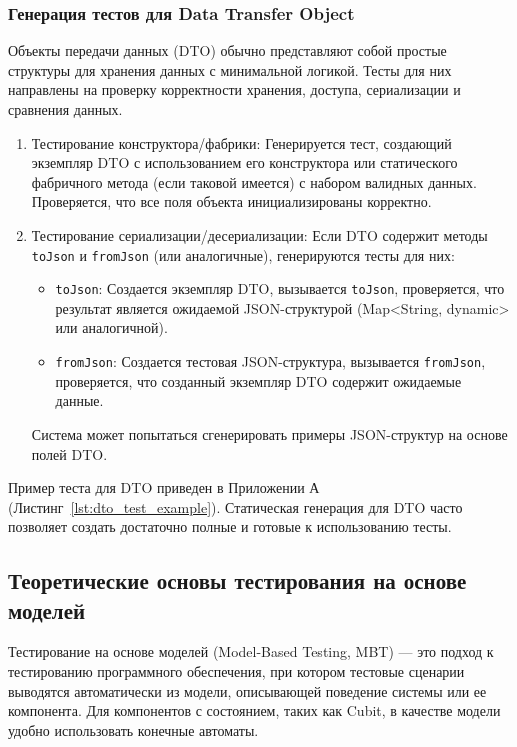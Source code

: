 \documentclass[14pt, russian]{scrartcl}
\begin{document}
\subsubsection{Генерация тестов для Data Transfer Object}

Объекты передачи данных (DTO) обычно представляют собой простые структуры для хранения данных с минимальной логикой. Тесты для них направлены на проверку корректности хранения, доступа, сериализации и сравнения данных.

\begin{enumerate}
    \item {Тестирование конструктора/фабрики:} Генерируется тест, создающий экземпляр DTO с использованием его конструктора или статического фабричного метода (если таковой имеется) с набором валидных данных. Проверяется, что все поля объекта инициализированы корректно.
    \item {Тестирование сериализации/десериализации:} Если DTO содержит методы \texttt{toJson} и \texttt{fromJson} (или аналогичные), генерируются тесты для них:
        \begin{itemize}
            \item \texttt{toJson}: Создается экземпляр DTO, вызывается \texttt{toJson}, проверяется, что результат является ожидаемой JSON-структурой (Map<String, dynamic> или аналогичной).
            \item \texttt{fromJson}: Создается тестовая JSON-структура, вызывается \texttt{fromJson}, проверяется, что созданный экземпляр DTO содержит ожидаемые данные.
        \end{itemize}
        Система может попытаться сгенерировать примеры JSON-структур на основе полей DTO.
\end{enumerate}

Пример теста для DTO приведен в Приложении А (Листинг~\ref{lst:dto_test_example}). Статическая генерация для DTO часто позволяет создать достаточно полные и готовые к использованию тесты.

\subsection{Теоретические основы тестирования на основе моделей}

Тестирование на основе моделей (Model-Based Testing, MBT) — это подход к тестированию программного обеспечения, при котором тестовые сценарии выводятся автоматически из модели, описывающей поведение системы или ее компонента. Для компонентов с состоянием, таких как Cubit, в качестве модели удобно использовать конечные автоматы.
\end{document}
